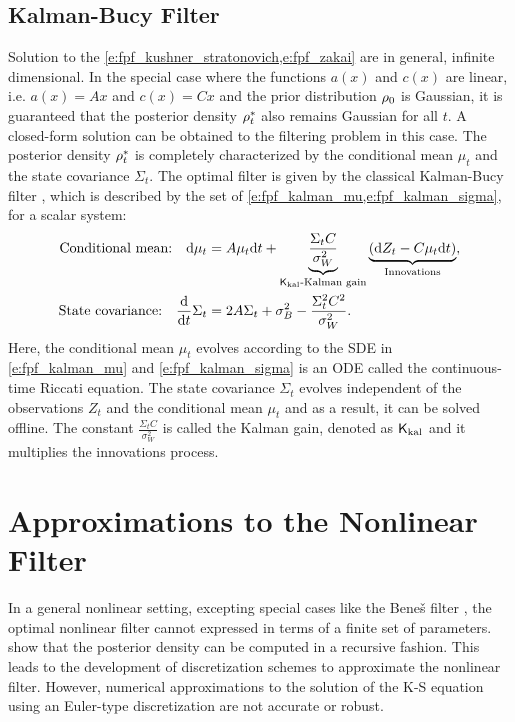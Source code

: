 \subsection{Kalman-Bucy Filter}
Solution to the \cref{e:fpf_kushner_stratonovich,e:fpf_zakai} are in general, infinite dimensional. In the special case where the functions $a(x)$ and $c(x)$ are linear, i.e. $a(x) = Ax$ and $c(x) = Cx$ and the prior distribution $\rho_0$ is Gaussian, it is guaranteed that the posterior density $\rho^*_t$ also remains Gaussian for all $t$. A closed-form solution can be obtained to the filtering problem in this case. The posterior density $\rho^*_t$ is completely characterized by the conditional mean $\mu_t$ and the state covariance $\Sigma_t$. The optimal filter is given by the classical Kalman-Bucy filter \cite{kal64}, which is described by the set of \cref{e:fpf_kalman_mu,e:fpf_kalman_sigma}, for a scalar system:
\begin{align}
\text{Conditional mean:} \quad \ud \mu_t & = A \mu_t \ud t + \underbrace{\frac{\Sigma_t C}{\sigma^2_W}}_{\Kkal  \text{-Kalman gain}} \underbrace{( \ud Z_t - C \mu_t \ud t)}_{\text{Innovations}}, 
\label{e:fpf_kalman_mu} \\
\text{State covariance:}  \quad  \frac{\ud}{\ud t} \Sigma_t &= 2 A \Sigma_t + \sigma^2_B - \frac{\Sigma^2_t C^2}{\sigma^2_W}. 
\label{e:fpf_kalman_sigma}
\end{align}
Here, the conditional mean $\mu_t$ evolves according to the SDE in \eqref{e:fpf_kalman_mu} and \eqref{e:fpf_kalman_sigma} is an ODE called the continuous-time Riccati equation. The state covariance $\Sigma_t$ evolves independent of the observations $Z_t$ and the conditional mean $\mu_t$ and as a result, it can be solved offline.  
The constant $\frac{\Sigma_t C}{\sigma^2_W}$ is called the Kalman gain, denoted as $\sf K_{\text{kal}}$ and it multiplies the innovations process. 
\section{Approximations to the Nonlinear Filter}
\label{s:approx_nl_filter}
In a general nonlinear setting, excepting special cases like the Bene\v{s} filter \cite{ben81}, the optimal nonlinear filter cannot expressed in terms of a finite set of parameters.  show that the posterior density can be computed in a recursive fashion. This leads to the development of discretization schemes to approximate the nonlinear filter. However, numerical approximations to the solution of the K-S equation using an Euler-type discretization are not accurate or robust. 

